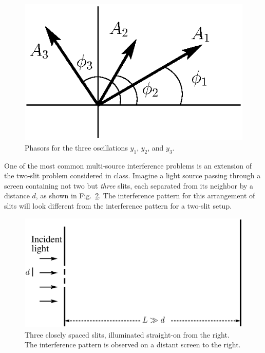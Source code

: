 \begin{figure}\begin{center}
 \includegraphics[width=2.4truein]{phasors/phasor15} 
\caption{\label{fig:phasor15}Phasors for the three oscillations $y_1$, $y_2$, 
and $y_3$.}
\end{center}
\end{figure}

One of the most common multi-source interference problems is an
extension of the two-slit problem considered in class. Imagine a light
source passing through a screen containing not two but {\em three}
slits, each separated from its neighbor by a distance $d$, as shown
in Fig.~\ref{fig:phasor16}.
 The interference pattern for this arrangement of slits will
look different from the interference pattern for a two-slit setup.


\begin{figure}\begin{center}
 \includegraphics[width=3.0truein]{phasors/phasor16} 
\caption{\label{fig:phasor16}Three closely spaced slits, illuminated straight-on
from the right. The interference pattern is observed on a distant screen to the right.}
\end{center}
\end{figure}



